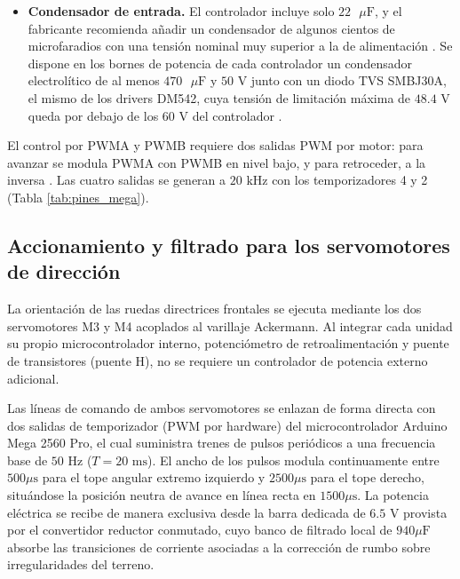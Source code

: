 \documentclass[../../General.tex]{subfiles}
\begin{document}
\begin{itemize}
    \item \textbf{Condensador de entrada.} El controlador incluye solo $22\text{ }\mu\text{F}$, y el fabricante recomienda añadir un condensador de algunos cientos de microfaradios con una tensión nominal muy superior a la de alimentación \citep{pololu_h2_36v11}. Se dispone en los bornes de potencia de cada controlador un condensador electrolítico de al menos $470\text{ }\mu\text{F}$ y $50\text{ V}$ junto con un diodo TVS SMBJ30A, el mismo de los drivers DM542, cuya tensión de limitación máxima de $48.4\text{ V}$ queda por debajo de los $60\text{ V}$ del controlador \citep{vishay_smbj}.
\end{itemize}

El control por PWMA y PWMB requiere dos salidas PWM por motor: para avanzar se modula PWMA con PWMB en nivel bajo, y para retroceder, a la inversa \citep{pololu_h2_36v11}. Las cuatro salidas se generan a $20\text{ kHz}$ con los temporizadores 4 y 2 (Tabla \ref{tab:pines_mega}).

\subsection{Accionamiento y filtrado para los servomotores de dirección}

La orientación de las ruedas directrices frontales se ejecuta mediante los dos servomotores M3 y M4 acoplados al varillaje Ackermann. Al integrar cada unidad su propio microcontrolador interno, potenciómetro de retroalimentación y puente de transistores (puente H), no se requiere un controlador de potencia externo adicional.

Las líneas de comando de ambos servomotores se enlazan de forma directa con dos salidas de temporizador (PWM por hardware) del microcontrolador Arduino Mega 2560 Pro, el cual suministra trenes de pulsos periódicos a una frecuencia base de $50\text{ Hz}$ ($T = 20\text{ ms}$). El ancho de los pulsos modula continuamente entre $500\mu\text{s}$ para el tope angular extremo izquierdo y $2500\mu\text{s}$ para el tope derecho, situándose la posición neutra de avance en línea recta en $1500\mu\text{s}$. La potencia eléctrica se recibe de manera exclusiva desde la barra dedicada de $6.5\text{ V}$ provista por el convertidor reductor conmutado, cuyo banco de filtrado local de $940\mu\text{F}$ absorbe las transiciones de corriente asociadas a la corrección de rumbo sobre irregularidades del terreno.
\end{document}
